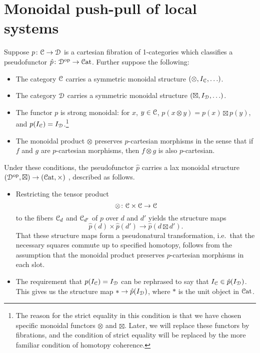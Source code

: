 \documentclass[main.tex]{subfiles}
\begin{document}
\section{Monoidal push-pull of local systems}
\label{sec:the_monoidal_construction}

Suppose $p\colon \mathcal{C} \to \mathcal{D}$ is a cartesian fibration of 1-categories which classifies a pseudofunctor $\hat{p}\colon \mathcal{D}^{\mathrm{op}} \to \mathcal{C}\mathrm{at}$. Further suppose the following:
\begin{itemize}
  \item The category $\mathcal{C}$ carries a symmetric monoidal structure $(\otimes, I_{\mathcal{C}}, \ldots)$.

  \item The category $\mathcal{D}$ carries a symmetric monoidal structure $(\boxtimes, I_{\mathcal{D}}, \ldots)$.

  \item The functor $p$ is strong monoidal: for $x$, $y \in \mathcal{C}$, $p(x \otimes y) = p(x) \boxtimes p(y)$, and $p(I_{\mathcal{C}}) = I_{\mathcal{D}}$.\footnote{The reason for the strict equality in this condition is that we have chosen specific monoidal functors $\otimes$ and $\boxtimes$. Later, we will replace these functors by fibrations, and the condition of strict equality will be replaced by the more familiar condition of homotopy coherence.}

  \item The monoidal product $\otimes$ preserves $p$-cartesian morphisms in the sense that if $f$ and $g$ are $p$-cartesian morphisms, then $f \otimes g$ is also $p$-cartesian.
\end{itemize}
Under these conditions, the pseudofunctor $\hat{p}$ carries a lax monoidal structure $(\mathcal{D}^{\mathrm{op}}, \boxtimes) \to (\mathcal{C}\mathrm{at}, \times)$ \cite{moeller2018monoidal}, described as follows. 
\begin{itemize}
  \item Restricting the tensor product
    \begin{equation*}
      \otimes\colon \mathcal{C} \times \mathcal{C} \to \mathcal{C}
    \end{equation*}
    to the fibers $\mathcal{C}_{d}$ and $\mathcal{C}_{d'}$ of $p$ over $d$ and $d'$ yields the structure maps
    \begin{equation*}
      \hat{p}(d) \times \hat{p}(d') \to \hat{p}(d \boxtimes d').
    \end{equation*}
    That these structure maps form a pseudonatural transformation, i.e.\ that the necessary squares commute up to specified homotopy, follows from the assumption that the monoidal product preserves $p$-cartesian morphisms in each slot.

  \item The requirement that $p(I_{\mathcal{C}}) = I_{\mathcal{D}}$ can be rephrased to say that $I_{\mathcal{C}} \in \hat{p}(I_{\mathcal{D}})$. This gives us the structure map $\ast \to \hat{p}(I_{\mathcal{D}})$, where $\ast$ is the unit object in $\mathcal{C}\mathrm{at}$.
\end{itemize}
\end{document}
